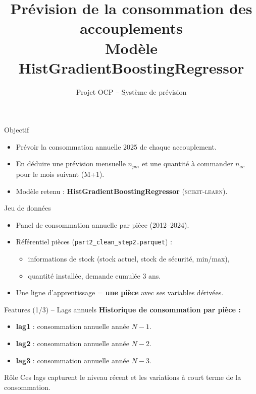 \documentclass[aspectratio=169]{beamer}
\title[Modèle HistGradientBoosting]{Prévision de la consommation des accouplements\\Modèle HistGradientBoostingRegressor}
\author{Projet OCP -- Système de prévision}
\date{}
\begin{document}
\begin{frame}
  \titlepage
\end{frame}

\begin{frame}{Objectif}
  \begin{itemize}
    \item Prévoir la consommation annuelle 2025 de chaque accouplement.
    \item En déduire une prévision mensuelle $n_{pm}$ et une quantité à commander $n_{ac}$ pour le mois suivant (M+1).
    \item Modèle retenu : \textbf{HistGradientBoostingRegressor} (\textsc{scikit-learn}).
  \end{itemize}
\end{frame}

\begin{frame}{Jeu de données}
  \begin{itemize}
    \item Panel de consommation annuelle par pièce (2012--2024).
    \item Référentiel pièces (\texttt{part2\_clean\_step2.parquet}) :
      \begin{itemize}
        \item informations de stock (stock actuel, stock de sécurité, min/max),
        \item quantité installée, demande cumulée 3 ans.
      \end{itemize}
    \item Une ligne d'apprentissage = \textbf{une pièce} avec ses variables dérivées.
  \end{itemize}
\end{frame}

\begin{frame}{Features (1/3) -- Lags annuels}
  \textbf{Historique de consommation par pièce :}
  \begin{itemize}
    \item \textbf{lag1} : consommation annuelle année $N-1$.
    \item \textbf{lag2} : consommation annuelle année $N-2$.
    \item \textbf{lag3} : consommation annuelle année $N-3$.
  \end{itemize}
  \vspace{0.5em}
  \begin{block}{Rôle}
    Ces lags capturent le niveau récent et les variations à court terme de la consommation.
  \end{block}
\end{frame}
\end{document}
